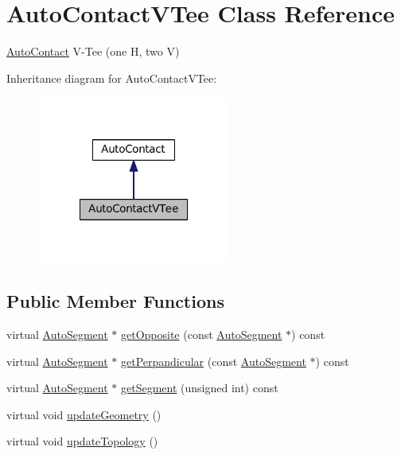 \hypertarget{classKatabatic_1_1AutoContactVTee}{}\section{Auto\+Contact\+V\+Tee Class Reference}
\label{classKatabatic_1_1AutoContactVTee}


\mbox{\hyperlink{classKatabatic_1_1AutoContact}{Auto\+Contact}} V-\/\+Tee (one H, two V)  




Inheritance diagram for Auto\+Contact\+V\+Tee\+:\nopagebreak
\begin{figure}[H]
\begin{center}
\leavevmode
\includegraphics[width=180pt]{classKatabatic_1_1AutoContactVTee__inherit__graph}
\end{center}
\end{figure}
\subsection*{Public Member Functions}
\begin{DoxyCompactItemize}
\item 
virtual \mbox{\hyperlink{classKatabatic_1_1AutoSegment}{Auto\+Segment}} $\ast$ \mbox{\hyperlink{classKatabatic_1_1AutoContactVTee_ac9c9b04e245a1109e297510a3968b7ac}{get\+Opposite}} (const \mbox{\hyperlink{classKatabatic_1_1AutoSegment}{Auto\+Segment}} $\ast$) const
\item 
virtual \mbox{\hyperlink{classKatabatic_1_1AutoSegment}{Auto\+Segment}} $\ast$ \mbox{\hyperlink{classKatabatic_1_1AutoContactVTee_ad99dd549214e43b6509fd8e3aefae919}{get\+Perpandicular}} (const \mbox{\hyperlink{classKatabatic_1_1AutoSegment}{Auto\+Segment}} $\ast$) const
\item 
virtual \mbox{\hyperlink{classKatabatic_1_1AutoSegment}{Auto\+Segment}} $\ast$ \mbox{\hyperlink{classKatabatic_1_1AutoContactVTee_a99fa8a78e97a29f2fb5730eaaa59acfc}{get\+Segment}} (unsigned int) const
\item 
virtual void \mbox{\hyperlink{classKatabatic_1_1AutoContactVTee_a3e218f6934c51380fb15d0e2bd380071}{update\+Geometry}} ()
\item 
virtual void \mbox{\hyperlink{classKatabatic_1_1AutoContactVTee_af5bf1f5e71204ef84346e4e036175431}{update\+Topology}} ()
\end{DoxyCompactItemize}
